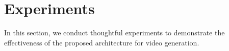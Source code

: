 \documentclass[runningheads]{llncs}
\def\mathbi#1{\textbf{\em #1}}
\begin{document}


\section{Experiments}
\label{sec:experiments}
In this section, we conduct thoughtful experiments to demonstrate the effectiveness of the proposed architecture for video generation. 
\end{document}
